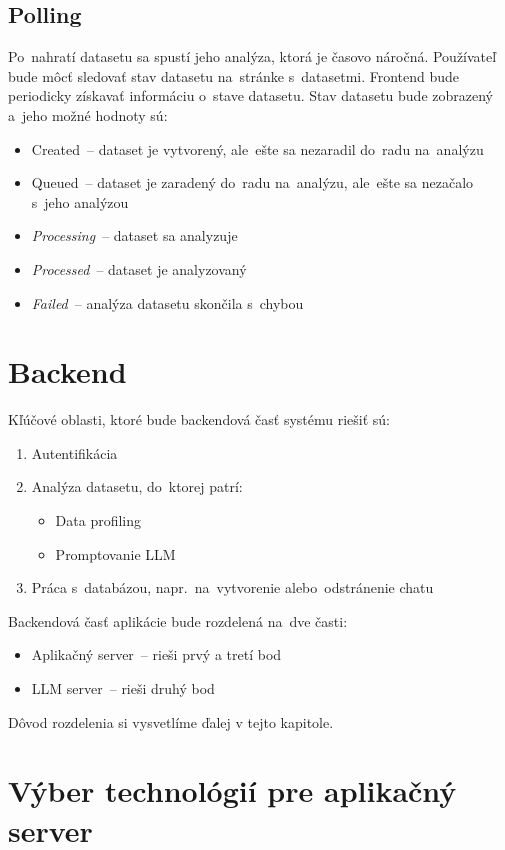 \subsection{Polling}

Po~nahratí datasetu sa spustí jeho analýza, ktorá je časovo náročná. Používateľ bude môcť sledovať stav datasetu na~stránke s~datasetmi. Frontend bude periodicky získavať informáciu o~stave datasetu. Stav datasetu bude zobrazený a~jeho možné hodnoty sú:
\begin{itemize}
\item Created~-- dataset je vytvorený, ale~ešte sa nezaradil do~radu na~analýzu
\item Queued~-- dataset je zaradený do~radu na~analýzu, ale~ešte sa nezačalo s~jeho analýzou
\item \textit{Processing}~-- dataset sa analyzuje
\item \textit{Processed}~-- dataset je analyzovaný
\item \textit{Failed}~-- analýza datasetu skončila s~chybou
\end{itemize}

\section{Backend}

Kľúčové oblasti, ktoré bude backendová časť systému riešiť sú:
\begin{enumerate}
\item Autentifikácia
\item Analýza datasetu, do~ktorej patrí:
\begin{itemize}
\item Data profiling
\item Promptovanie LLM
\end{itemize}
\item Práca s~databázou, napr.~na~vytvorenie alebo~odstránenie chatu
\end{enumerate}

Backendová časť aplikácie bude rozdelená na~dve časti:
\begin{itemize}
\item Aplikačný server~-- rieši prvý a tretí bod
\item LLM server~-- rieši druhý bod
\end{itemize}

Dôvod rozdelenia si vysvetlíme ďalej v tejto kapitole.

\section{Výber technológií pre aplikačný server}

